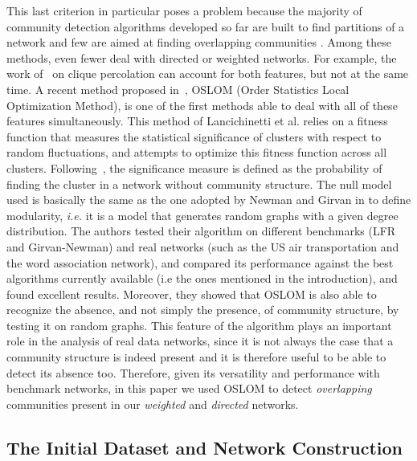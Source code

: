 This last criterion in particular poses a problem because the majority of community detection algorithms developed so far are built to find partitions of a network and few are aimed at finding overlapping communities \cite{Aicher26062014,BaumesGKMP05,PalEtAl05,ZhaWanZha07,Gre07,PhysRevE.77.016107,Lancichinetti2009,PhysRevE.80.016105,Kovacs2010}. Among these methods, even fewer deal with directed or weighted networks. For example, the work of~\cite{PalEtAl05} on clique percolation can account for both features, but not at the same time. A recent method proposed in~\cite{LancichinettiPlos}, OSLOM (Order Statistics Local Optimization Method), is one of the first methods  able to deal with all of these features simultaneously. This method of Lancichinetti et al. relies on a fitness function that measures the statistical significance of clusters with respect to random fluctuations, and attempts to optimize this fitness function across all clusters. 
Following~\cite{LancichinettiPlos}, the significance measure is defined as the probability of finding the cluster in a network without community structure. The null model used is basically the same as the one adopted by Newman and Girvan in \cite{newman2004finding} to define modularity, {\it i.e.} it is a model that generates random graphs with a given degree distribution. The authors tested their algorithm on different benchmarks (LFR and Girvan-Newman) and real networks (such as the US air transportation and the word association network), and compared its performance against the best algorithms
currently available (i.e the ones mentioned in the introduction), and found excellent results. Moreover, they showed that OSLOM is also able to recognize the absence, and not simply the presence, of community structure, by testing it on random graphs. This feature of the algorithm plays an important role in the analysis of real data networks, since it is not always the case that a community structure is indeed present and it is therefore useful to be able to detect its absence too. 
Therefore, given its versatility and performance with benchmark networks, in this paper we used OSLOM to detect \emph{overlapping} communities present in our \emph{weighted} and \emph{directed} networks.

\subsection{The Initial Dataset and Network Construction}

